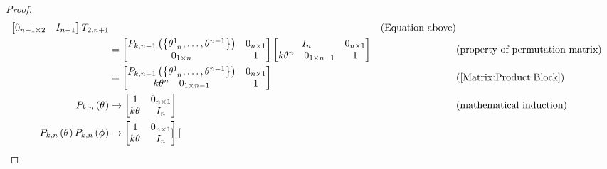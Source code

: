 \documentclass[../main.tex]{subfiles}
\begin{document}
\begin{proof}
\begin{align*}
\begin{bmatrix}
            0_{{n-1}\times{2}}                  & {I}_{n-1}          \\
        \end{bmatrix}
        T_{2,n+1} && \text{(Equation above)} \\
        &=
        \begin{bmatrix}
            P_{k,n-1}\left(\left\{\tensor{\theta}{^1_{n}},\dots,\tensor{\theta}{^{n-1}}\right\}\right) & 0_{n\times 1} \\
            0_{1\times n}                                                                              & 1             \\
        \end{bmatrix}
        \begin{bmatrix}
            {I}_{n} & 0_{n \times1}          \\
            \begin{matrix*}k\tensor{\theta}{^n} & 0_{1\times n-1}\end{matrix*} & 1 \\
        \end{bmatrix} && \text{(property of permutation matrix)} \\
        &=
        \begin{bmatrix}
            P_{k,n-1}\left(\left\{\tensor{\theta}{^1_{n}},\dots,\tensor{\theta}{^{n-1}}\right\}\right) & 0_{n \times1}          \\
            \begin{matrix*}k\tensor{\theta}{^n} & 0_{1\times n-1}\end{matrix*} & 1 \\
        \end{bmatrix} && \text{(\cref{Matrix:Product:Block})} \\
        P_{k,n}\left(\tensor{\theta}{}\right)
        &\to
        \begin{bmatrix}
            1 & 0_{n \times1}          \\
            k\tensor{\theta}{} & I_n \\
        \end{bmatrix} && \text{(mathematical induction)} \\
        P_{k,n}\left(\tensor{\theta}{}\right) P_{k,n}\left(\tensor{\phi}{}\right)
        &\to
        \begin{bmatrix}
            1 & 0_{n \times1}          \\
            k\tensor{\theta}{} & I_n \\
        \end{bmatrix}\begin{bmatrix}

\end{bmatrix}
\end{align*}
\end{proof}
\end{document}

